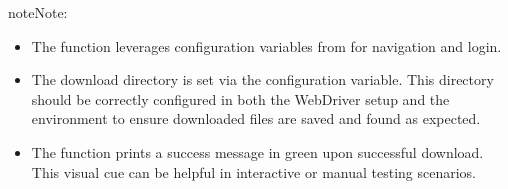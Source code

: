 \documentclass[letterpaper,10pt,english]{sphinxmanual}
\begin{document}
\begin{fulllineitems}
\begin{quote}
\begin{description}
\end{description}\end{quote}

\begin{sphinxadmonition}{note}{Note:}\begin{itemize}
\item {} 
\sphinxAtStartPar
The function leverages configuration variables from  for navigation
and login.

\item {} 
\sphinxAtStartPar
The download directory is set via the  configuration variable. This directory should
be correctly configured in both the WebDriver setup and the environment to ensure downloaded files are
saved and found as expected.

\item {} 
\sphinxAtStartPar
The function prints a success message in green upon successful download. This visual cue can be helpful in
interactive or manual testing scenarios.

\end{itemize}
\end{sphinxadmonition}

\begin{sphinxVerbatim}[commandchars=\\\{\}]
   
  
  
   
 
\end{sphinxVerbatim}

\end{fulllineitems}
\end{document}
